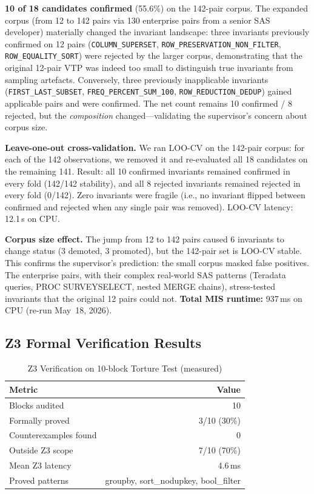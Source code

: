 \documentclass[conference]{IEEEtran}
\begin{document}
\textbf{10 of 18 candidates confirmed} (55.6\%) on the 142-pair corpus.
The expanded corpus (from 12 to 142 pairs via 130 enterprise pairs from a senior
SAS developer) materially changed the invariant landscape: three invariants
previously confirmed on 12 pairs (\texttt{COLUMN\_SUPERSET},
\texttt{ROW\_PRESERVATION\_NON\_FILTER}, \texttt{ROW\_EQUALITY\_SORT}) were
rejected by the larger corpus, demonstrating that the original 12-pair VTP was
indeed too small to distinguish true invariants from sampling artefacts. Conversely,
three previously inapplicable invariants (\texttt{FIRST\_LAST\_SUBSET},
\texttt{FREQ\_PERCENT\_SUM\_100}, \texttt{ROW\_REDUCTION\_DEDUP}) gained applicable
pairs and were confirmed. The net count remains 10 confirmed / 8 rejected, but the
\emph{composition} changed---validating the supervisor's concern about corpus size.

\textbf{Leave-one-out cross-validation.} We ran LOO-CV on the 142-pair corpus:
for each of the 142 observations, we removed it and re-evaluated all 18 candidates
on the remaining 141. Result: all 10 confirmed invariants remained confirmed in
every fold (142/142 stability), and all 8 rejected invariants remained rejected in
every fold (0/142). Zero invariants were fragile (i.e., no invariant flipped between
confirmed and rejected when any single pair was removed).
LOO-CV latency: 12.1\,s on CPU.

\textbf{Corpus size effect.} The jump from 12 to 142 pairs caused 6 invariants
to change status (3 demoted, 3 promoted), but the 142-pair set is LOO-CV stable.
This confirms the supervisor's prediction: the small corpus masked false positives.
The enterprise pairs, with their complex real-world SAS patterns (Teradata queries,
PROC SURVEYSELECT, nested MERGE chains), stress-tested invariants that the original
12 pairs could not.
\textbf{Total MIS runtime:} 937\,ms on CPU (re-run May~18, 2026).

\subsection{Z3 Formal Verification Results}

\begin{table}[t]
  \caption{Z3 Verification on 10-block Torture Test (measured)}
  \label{tab:z3}
  \centering
  \small
  \begin{tabular}{@{}l r@{}}
    \toprule
    \textbf{Metric} & \textbf{Value} \\
    \midrule
    Blocks audited         & 10 \\
    Formally proved        & 3/10 (30\%) \\
    Counterexamples found  & 0 \\
    Outside Z3 scope       & 7/10 (70\%) \\
    Mean Z3 latency        & 4.6\,ms \\
    Proved patterns        & groupby, sort\_nodupkey, bool\_filter \\
    \bottomrule
  \end{tabular}
\end{table}
\end{document}
